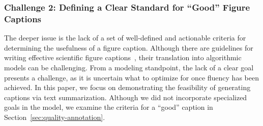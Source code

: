 \subsubsection{Challenge 2: Defining a Clear Standard for ``Good'' Figure Captions}
The deeper issue is the lack of a set of well-defined and actionable criteria for determining the usefulness of a figure caption.
Although there are guidelines for writing effective scientific figure captions~\cite{10.1371/journal.pcbi.1003833,doi:10.1021/acsenergylett.9b00253}, their translation into algorithmic models can be challenging.
From a modeling standpoint, the lack of a clear goal presents a challenge, as it is uncertain what to optimize for once fluency has been achieved.
In this paper, we focus on demonstrating the feasibility of generating captions via text summarization.
Although we did not incorporate specialized goals in the model, we examine the criteria for a ``good'' caption in Section~\ref{sec:quality-annotation}.










